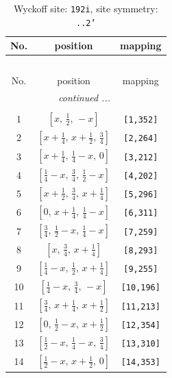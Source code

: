 \documentclass[fleqn,8pt]{jsarticle}
\begin{document}
\begin{longtable}{ccc}
\caption{Wyckoff site: {\tt 192i}, site symmetry: {\tt ..2'}}
 \\
 \hline \hline
No. & position & mapping \\ \hline \endfirsthead

\multicolumn{2}{l}{\tablename\ \thetable{}} \\
 \hline \hline
No. & position & mapping \\ \hline \endhead

 \hline \hline
\multicolumn{2}{r}{\footnotesize\it continued ...} \\ \endfoot

 \hline \hline
\multicolumn{2}{r}{} \\ \endlastfoot

1 & $\left[ x,\, \frac{1}{2},\, - x \right]$ & {\tt [1,352]} \\ \hline
2 & $\left[ x + \frac{1}{4},\, x + \frac{1}{2},\, \frac{3}{4} \right]$ & {\tt [2,264]} \\ \hline
3 & $\left[ x + \frac{1}{4},\, \frac{1}{4} - x,\, 0 \right]$ & {\tt [3,212]} \\ \hline
4 & $\left[ \frac{1}{4} - x,\, \frac{3}{4},\, \frac{1}{2} - x \right]$ & {\tt [4,202]} \\ \hline
5 & $\left[ x + \frac{1}{2},\, \frac{3}{4},\, x + \frac{1}{4} \right]$ & {\tt [5,296]} \\ \hline
6 & $\left[ 0,\, x + \frac{1}{4},\, \frac{1}{4} - x \right]$ & {\tt [6,311]} \\ \hline
7 & $\left[ \frac{3}{4},\, \frac{1}{2} - x,\, \frac{1}{4} - x \right]$ & {\tt [7,259]} \\ \hline
8 & $\left[ x,\, \frac{3}{4},\, x + \frac{1}{4} \right]$ & {\tt [8,293]} \\ \hline
9 & $\left[ \frac{1}{4} - x,\, \frac{1}{2},\, x + \frac{1}{4} \right]$ & {\tt [9,255]} \\ \hline
10 & $\left[ \frac{1}{4} - x,\, \frac{3}{4},\, - x \right]$ & {\tt [10,196]} \\ \hline
11 & $\left[ \frac{3}{4},\, x + \frac{1}{4},\, x + \frac{1}{2} \right]$ & {\tt [11,213]} \\ \hline
12 & $\left[ 0,\, \frac{1}{2} - x,\, x + \frac{1}{2} \right]$ & {\tt [12,354]} \\ \hline
13 & $\left[ \frac{1}{2} - x,\, \frac{1}{4} - x,\, \frac{3}{4} \right]$ & {\tt [13,310]} \\ \hline
14 & $\left[ \frac{1}{2} - x,\, x + \frac{1}{2},\, 0 \right]$ & {\tt [14,353]} \\ \hline

\end{longtable}
\end{document}
